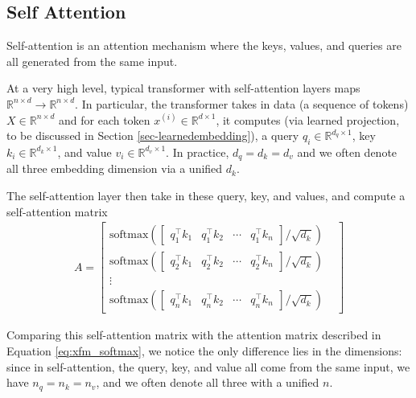 \subsection{Self Attention}
Self-attention is an attention mechanism where the keys, values, and queries are all generated from the same input.

At a very high level, typical transformer with self-attention layers maps $\mathbb{R}^{n\times d} \longrightarrow \mathbb{R}^{n\times d}$. In particular, the transformer takes in data (a sequence of tokens) $X\in \mathbb{R}^{n\times d}$ and for each token $x^{(i)}\in \mathbb{R}^{d\times 1}$, it computes (via learned projection, to be discussed in Section \ref{sec-learnedembedding}), a query $q_i \in \mathbb{R}^{d_q\times 1}$, key $k_{i} \in \mathbb{R}^{d_k\times 1}$, and value $v_{i} \in \mathbb{R}^{d_v\times 1}$. In practice, $d_q=d_k=d_v$ and we often denote all three embedding dimension via a unified $d_k.$

The self-attention layer then take in these query, key, and values, and compute a self-attention matrix
\begin{eqnarray}A = \begin{bmatrix}
    \text{softmax}\left( \begin{bmatrix}
                           q_1^\top k_1 & q_1^\top k_2 & \cdots & q_1^\top k_{n}
                         \end{bmatrix} / \sqrt{d_k} \right) \\
    \text{softmax}\left( \begin{bmatrix}
                           q_2^\top k_1 & q_2^\top k_2 & \cdots & q_2^\top k_{n}
                         \end{bmatrix} / \sqrt{d_k} \right) \\
    \vdots &                                                                   \\
    \text{softmax}\left( \begin{bmatrix}
                           q_{n}^\top k_1 & q_{n}^\top k_2 & \cdots & q_{n}^\top k_{n}
                         \end{bmatrix} / \sqrt{d_k} \right)
  \end{bmatrix}
\end{eqnarray}\label{eq:self_softmax}

Comparing this self-attention matrix with the attention matrix described in Equation \ref{eq:xfm_softmax}, we notice the only difference lies in the dimensions: since in self-attention, the query, key, and value all come from the same input, we have $n_q=n_k=n_v$, and we often denote all three with a unified $n$.

